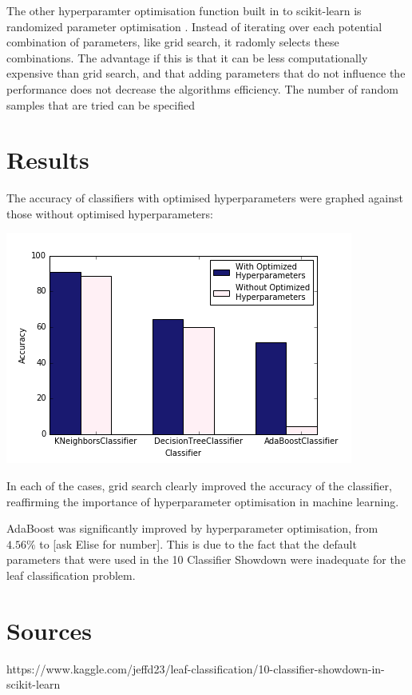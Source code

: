 \documentclass{article}
\begin{document}
	The other hyperparamter optimisation function built in to  scikit-learn is randomized parameter optimisation \cite{gridsearch}. Instead of iterating over each potential combination of parameters, like grid search, it radomly selects these combinations. The advantage if this is that it can be less computationally expensive than grid search, and that adding parameters that do not influence the performance does not decrease the algorithms efficiency. The number of random samples that are tried can be specified 

\newpage
\section{Results}

The accuracy of classifiers with optimised hyperparameters were graphed against those without optimised hyperparameters:

\includegraphics[scale=0.7]{acc_class}

In each of the cases, grid search clearly improved the accuracy of the classifier, reaffirming the importance of hyperparameter optimisation in machine learning. 

AdaBoost was significantly improved by hyperparameter optimisation, from $4.56\%$ to [ask Elise for number]. This is due to the fact that the default parameters that were used in the 10 Classifier Showdown \cite{showdown} were inadequate for the leaf classification problem. 







\section{Sources}


https://www.kaggle.com/jeffd23/leaf-classification/10-classifier-showdown-in-scikit-learn
\end{document}
